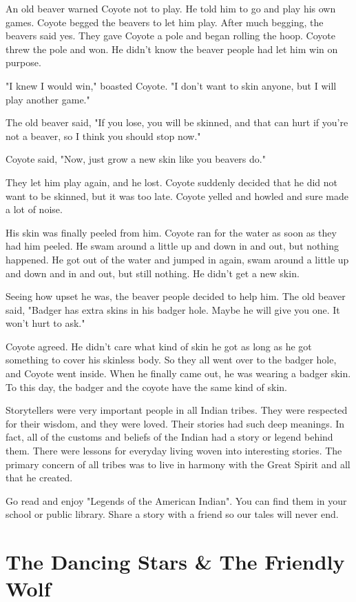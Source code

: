 An old beaver warned Coyote not to play. He told him to go and play his own games. Coyote begged the beavers to let him play. After much begging, the beavers said yes. They gave Coyote a pole and began rolling the hoop. Coyote threw the pole and won. He didn't know the beaver people had let him win on purpose.

"I knew I would win," boasted Coyote. "I don't want to skin anyone, but I will play another game."

The old beaver said, "If you lose, you will be skinned, and that can hurt if you're not a beaver, so I think you should stop now."

Coyote said, "Now, just grow a new skin like you beavers do."

They let him play again, and he lost. Coyote suddenly decided that he did not want to be skinned, but it was too late. Coyote yelled and howled and sure made a lot of noise.

His skin was finally peeled from him. Coyote ran for the water as soon as they had him peeled. He swam around a little up and down in and out, but nothing happened. He got out of the water and jumped in again, swam around a little up and down and in and out, but still nothing. He didn't get a new skin.

Seeing how upset he was, the beaver people decided to help him. The old beaver said, "Badger has extra skins in his badger hole. Maybe he will give you one. It won't hurt to ask."

Coyote agreed. He didn't care what kind of skin he got as long as he got something to cover his skinless body. So they all went over to the badger hole, and Coyote went inside. When he finally came out, he was wearing a badger skin. To this day, the badger and the coyote have the same kind of skin.

Storytellers were very important people in all Indian tribes. They were respected for their wisdom, and they were loved. Their stories had such deep meanings. In fact, all of the customs and beliefs of the Indian had a story or legend behind them. There were lessons for everyday living woven into interesting stories. The primary concern of all tribes was to live in harmony with the Great Spirit and all that he created.

Go read and enjoy "Legends of the American Indian". You can find them in your school or public library. Share a story with a friend so our tales will never end.

\section{The Dancing Stars \& The Friendly Wolf}

